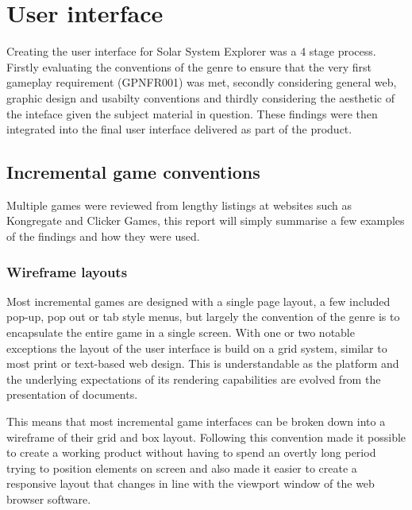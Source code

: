\documentclass[twoside]{bhamthesis}
\begin{document}
\section{User interface}

Creating the user interface for Solar System Explorer was a 4 stage process. Firstly evaluating the conventions of the genre to ensure that the very first gameplay requirement (GPNFR001) was met, secondly considering general web, graphic design and usabilty conventions and thirdly considering the aesthetic of the inteface given the subject material in question. These findings were then integrated into the final user interface delivered as part of the product.

\subsection{Incremental game conventions}

Multiple games were reviewed from lengthy listings at websites such as Kongregate and Clicker Games, this report will simply summarise a few examples of the findings and how they were used.

\subsubsection{Wireframe layouts}

Most incremental games are designed with a single page layout, a few included pop-up, pop out or tab style menus, but largely the convention of the genre is to encapsulate the entire game in a single screen. With one or two notable exceptions the layout of the user interface is build on a grid system, similar to most print or text-based web design. This is understandable as the platform and the underlying expectations of its rendering capabilities are evolved from the presentation of documents.

This means that most incremental game interfaces can be broken down into a wireframe of their grid and box layout. Following this convention made it possible to create a working product without having to spend an overtly long period trying to position elements on screen and also made it easier to create a responsive layout that changes in line with the viewport window of the web browser software.
\end{document}
